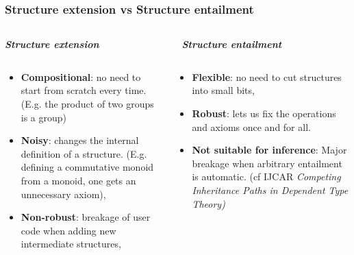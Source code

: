 \documentclass[11pt]{beamer}
\begin{document}
\begin{frame}
  \frametitle{Structure extension vs Structure entailment}
  \begin{columns}
    \begin{column}{0.5\textwidth}
      \begin{center}
        {\bf \emph{Structure extension}}
      \end{center}
    \end{column}
    \begin{column}{0.5\textwidth}
      \begin{center}
        {\bf \emph{Structure entailment}}
      \end{center}
    \end{column}
  \end{columns}
  \vfill
  \begin{columns}
    \begin{column}{0.5\textwidth}
      \begin{itemize}
      \item \textbf{Compositional}: no need to start from scratch every time.
        (E.g. the product of two groups is a group)
        \pause\vfill
      \item \textbf{Noisy}: changes the internal definition of a structure.
        (E.g. defining a commutative monoid from a monoid, one gets an unnecessary axiom),
        \pause\vfill
      \item \textbf{Non-robust}: breakage of user code when adding new
        intermediate structures, \pause\vfill
      \end{itemize}
    \end{column}
    \begin{column}{0.5\textwidth}
      \begin{itemize}
      \item \textbf{Flexible}: no need to cut structures
        into small bits,
        \pause\vfill
      \item \textbf{Robust}: lets us fix the operations and axioms
        once and for all.
        \pause\vfill
      \item \textbf{Not suitable for inference}: Major breakage when
        arbitrary entailment is automatic. (cf IJCAR \emph{Competing
          Inheritance Paths in Dependent Type Theory)} \pause\vfill
      \end{itemize}
    \end{column}
  \end{columns}
  \vfill

\end{frame}
\end{document}
